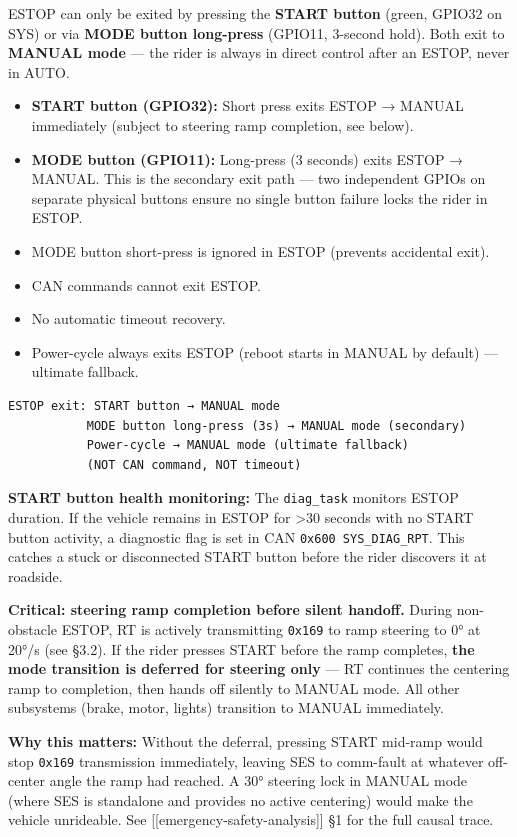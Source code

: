 \documentclass[12pt,a4paper,oneside]{report}
\providecommand{\tightlist}{\setlength{\itemsep}{0pt}\setlength{\parskip}{0pt}}
\begin{document}
ESTOP can only be exited by pressing the \textbf{START button} (green, GPIO32 on
SYS) or via \textbf{MODE button long-press} (GPIO11, 3-second hold). Both exit
to \textbf{MANUAL mode} --- the rider is always in direct control after an
ESTOP, never in AUTO.

\begin{itemize}
\tightlist
\item
  \textbf{START button (GPIO32):} Short press exits ESTOP → MANUAL immediately
  (subject to steering ramp completion, see below).
\item
  \textbf{MODE button (GPIO11):} Long-press (3 seconds) exits ESTOP → MANUAL.
  This is the secondary exit path --- two independent GPIOs on separate physical
  buttons ensure no single button failure locks the rider in ESTOP.
\item
  MODE button short-press is ignored in ESTOP (prevents accidental exit).
\item
  CAN commands cannot exit ESTOP.
\item
  No automatic timeout recovery.
\item
  Power-cycle always exits ESTOP (reboot starts in MANUAL by default) ---
  ultimate fallback.
\end{itemize}

\begin{verbatim}
ESTOP exit: START button → MANUAL mode
           MODE button long-press (3s) → MANUAL mode (secondary)
           Power-cycle → MANUAL mode (ultimate fallback)
           (NOT CAN command, NOT timeout)
\end{verbatim}

\textbf{START button health monitoring:} The \texttt{diag\_task} monitors ESTOP
duration. If the vehicle remains in ESTOP for \textgreater30 seconds with no
START button activity, a diagnostic flag is set in CAN
\texttt{0x600\ SYS\_DIAG\_RPT}. This catches a stuck or disconnected START
button before the rider discovers it at roadside.

\textbf{Critical: steering ramp completion before silent handoff.} During
non-obstacle ESTOP, RT is actively transmitting \texttt{0x169} to ramp steering
to 0° at 20°/s (see §3.2). If the rider presses START before the ramp completes,
\textbf{the mode transition is deferred for steering only} --- RT continues the
centering ramp to completion, then hands off silently to MANUAL mode. All other
subsystems (brake, motor, lights) transition to MANUAL immediately.

\textbf{Why this matters:} Without the deferral, pressing START mid-ramp would
stop \texttt{0x169} transmission immediately, leaving SES to comm-fault at
whatever off-center angle the ramp had reached. A 30° steering lock in MANUAL
mode (where SES is standalone and provides no active centering) would make the
vehicle unrideable. See {[}{[}emergency-safety-analysis{]}{]} §1 for the full
causal trace.
\end{document}
